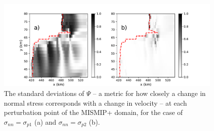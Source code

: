 \documentclass[review,oneside]{igs}
\begin{document}
\begin{figure}
	\centering
    \includegraphics[width=1\linewidth]{figs/stressDiff_velDiff_GL_allPerturb.pdf}
    \caption{The standard deviations of $\Psi$ -- a metric for how closely a change in normal stress corresponds with a change in velocity -- at each perturbation point of the MISMIP+ domain, for the case of $\sigma_{nn}=\sigma_{p1}$ (a) and $\sigma_{nn}=\sigma_{p2}$ (b).}
	\label{fig5}
\end{figure}
\end{document}
